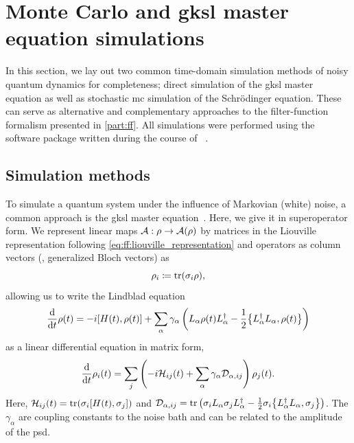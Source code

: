 \section{Monte Carlo and \texorpdfstring{\acrshort{gksl}}{GKSL} master equation simulations}\label{sec:app:ff:time_domain_methods}
In this section, we lay out two common time-domain simulation methods of noisy quantum dynamics for completeness; direct simulation of the \gls{gksl} master equation as well as stochastic \gls{mc} simulation of the Schrödinger equation.
These can serve as alternative and complementary approaches to the filter-function formalism presented in \cref{part:ff}.
All simulations were performed using the \lmt software package written during the course of \thethesis~\cite{Hangleiter_lmt}.

\subsection{Simulation methods}\label{subsec:app:ff:time_domain_methods:methods}
To simulate a quantum system under the influence of Markovian (white) noise, a common approach is the \gls{gksl} master equation~\cite{Lindblad1976,Gorini1976}.
Here, we give it in superoperator form.
We represent linear maps $\mathcal{A}: \rho\rightarrow\mathcal{A}(\rho)$ by matrices in the Liouville representation following \cref{eq:ff:liouville_representation}
and operators as column vectors (\ie, generalized Bloch vectors) as
\begin{equation}\label{eq:app:ff:bloch_vector}
    \rho_i \coloneqq \tr(\sigma_i\rho),
\end{equation}
allowing us to write the Lindblad equation
\begin{equation}\label{eq:app:ff:lindblad:hilbert}
    \dv{t}\rho(t) = -\i\comm{H(t)}{\rho(t)} + \sum_\alpha \gamma_\alpha\left(L_\alpha\rho(t) L_\alpha\adjoint - \frac{1}{2}\acomm{L_\alpha\adjoint L_\alpha}{\rho(t)}\right)
\end{equation}
as a linear differential equation in matrix form,
\begin{equation}\label{eq:app:ff:lindlbad:liouville}
    \dv{t}\rho_i(t) = \sum_j\left(-i\mathcal{H}_{ij}(t)+ \sum_\alpha \gamma_\alpha \mathcal{D}_{\alpha, ij}\right)\rho_j(t).
\end{equation}
Here, $\mc{H}_{ij}(t) = \tr(\sigma_i\comm{H(t)}{\sigma_j})$ and $\mc{D}_{\alpha, ij} = \tr\left(\sigma_i L_\alpha\sigma_j L_\alpha\adjoint - \frac{1}{2}\sigma_i \acomm{L_\alpha\adjoint L_\alpha}{\sigma_j}\right)$.
The $\gamma_\alpha$ are coupling constants to the noise bath and can be related to the amplitude of the \gls{psd}.
